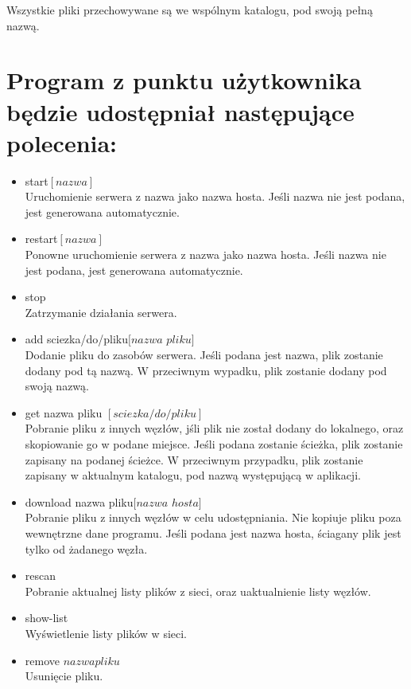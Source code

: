 \documentclass[10pt,a4paper]{article}
\begin{document}
Wszystkie pliki przechowywane są we wspólnym katalogu, pod swoją pełną nazwą.



\section{Program z punktu użytkownika będzie udostępniał następujące polecenia:}
\begin{itemize}
\item start$[nazwa]$\\
Uruchomienie serwera z nazwa jako nazwa hosta. Jeśli nazwa nie jest podana, jest generowana automatycznie.
\item restart$[nazwa]$\\
Ponowne uruchomienie serwera z nazwa jako nazwa hosta. Jeśli nazwa nie jest podana, jest generowana automatycznie.

\item stop\\
Zatrzymanie działania serwera.

\item add sciezka/do/pliku$[nazwa$ $pliku]$\\
Dodanie pliku do zasobów serwera. Jeśli podana jest nazwa, plik zostanie dodany pod tą nazwą. W przeciwnym wypadku, plik zostanie dodany pod swoją nazwą.

\item get nazwa pliku $[sciezka/do/pliku]$\\
Pobranie pliku z innych węzłów, jśli plik nie został dodany do lokalnego, oraz skopiowanie go w podane miejsce. Jeśli podana zostanie ścieżka, plik zostanie zapisany na podanej ścieżce. W przeciwnym przypadku, plik zostanie zapisany w aktualnym katalogu, pod nazwą występującą w aplikacji.
\item download nazwa pliku$[nazwa$ $hosta]$\\
Pobranie pliku z innych węzłów w celu udostępniania. Nie kopiuje pliku poza wewnętrzne dane programu. Jeśli podana jest nazwa hosta, ściagany plik jest tylko od żadanego węzła.

\item rescan\\
Pobranie aktualnej listy plików z sieci, oraz uaktualnienie listy węzłów.

\item show-list\\
Wyświetlenie listy plików w sieci.
\item remove $nazwa$$pliku$\\
Usunięcie pliku.
\end{itemize}
\end{document}
